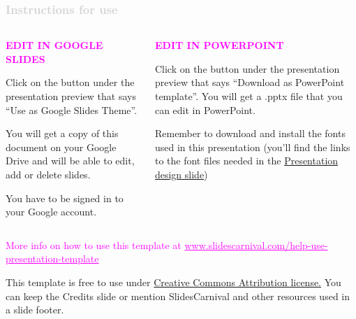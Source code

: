 \begin{frame}
\frametitle{\textcolor{lightgray}{Instructions for use}}

\begin{columns}[T]
    \begin{column}{0.4\textwidth}
        \textcolor{magenta}{\textbf{EDIT IN GOOGLE SLIDES}}
        \vspace{0.3cm}
        
        {Click on the button under the presentation preview that says ``Use as Google Slides Theme''.
        \vspace{0.3cm}
        
        You will get a copy of this document on your Google Drive and will be able to edit, add or delete slides.
        \vspace{0.3cm}
        
        You have to be signed in to your Google account.}
    \end{column}
    \begin{column}{0.4\textwidth}
        \textcolor{magenta}{\textbf{EDIT IN POWERPOINT\textregistered}}
        \vspace{0.3cm}
        
        {Click on the button under the presentation preview that says ``Download as PowerPoint template''. You will get a .pptx file that you can edit in PowerPoint.
        \vspace{0.3cm}
        
        Remember to download and install the fonts used in this presentation (you'll find the links to the font files needed in the \underline{Presentation design slide})}
    \end{column}
\end{columns}

\vfill
{\textcolor{magenta}{More info on how to use this template at \underline{www.slidescarnival.com/help-use-presentation-template}}}

\vspace{0.2cm}
{This template is free to use under \underline{Creative Commons Attribution license.} You can keep the Credits slide or mention SlidesCarnival and other resources used in a slide footer.}

\end{frame}
